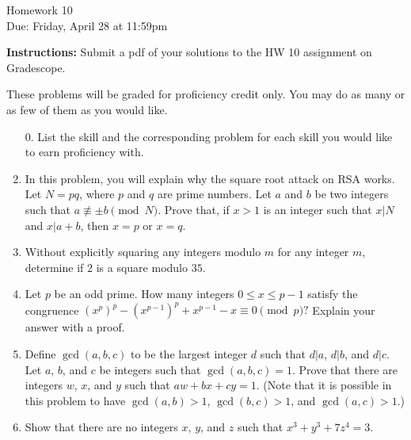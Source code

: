 \documentclass[12pt]{article}
\begin{document}
\begin{center}
{\Large Homework 10}\\
Due: Friday,  April 28 at 11:59pm\\


\end{center}
{\bf Instructions:} Submit a pdf of your solutions to the HW 10 assignment on Gradescope.  

{ These problems will be graded for proficiency credit only.  You may do as many or as few of them as you would like.}



\begin{enumerate}
\item[0.] List the skill and the corresponding problem for each skill you would like to earn proficiency with. 

\item In this problem, you will explain why the square root attack on RSA works. Let $N=pq$, where $p$ and $q$ are prime numbers.  Let $a$ and $b$ be two integers such that $a\not\equiv \pm b\pmod{N}$.  Prove that, if $x>1$ is an integer such that $x|N$ and $x|a+b$, then $x=p$ or $x=q$. 

\item Without explicitly squaring any integers modulo $m$ for any integer $m$, determine if $2$ is a square modulo $35$. 

\item Let $p$ be an odd prime. How many integers $0\le x \le p-1$ satisfy the congruence $(x^p)^p-(x^{p-1})^p+x^{p-1}-x\equiv 0\pmod{p}?$ Explain your answer with a proof. 

\item Define $\gcd(a,b,c)$ to be the largest integer $d$ such that $d|a$, $d|b$, and $d|c$.  Let $a$, $b$, and $c$ be integers such that $\gcd(a,b,c)=1$. Prove that there are integers $w$, $x$, and $y$ such that $aw+bx+cy=1$.  (Note that it is possible in this problem to have $\gcd(a,b)>1$, $\gcd(b,c)>1$, and $\gcd(a,c)>1$.)

\item Show that there are no integers $x$, $y$, and $z$ such that $x^3+y^3+7z^4=3$. 

\end{enumerate}
\end{document}
